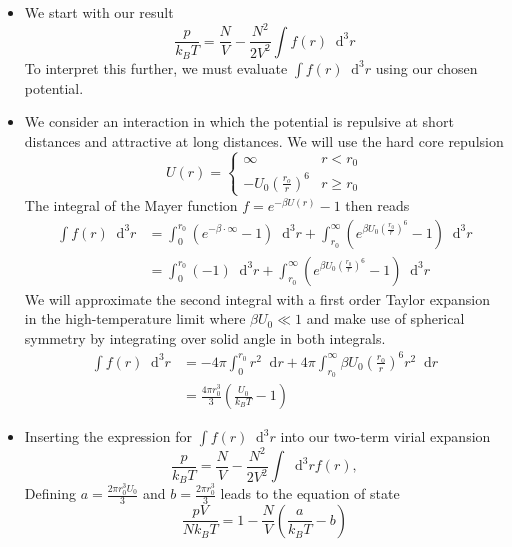 \documentclass[11pt, a4paper]{article}
\newcommand{\diff}{\mathop{}\!\mathrm{d}} %
\begin{document}
\begin{itemize}
	\item We start with our result
	\begin{equation*}
		\frac{p}{k_{B}T} = \frac{N}{V} - \frac{N^{2}}{2V^{2}} \int  f(r) \diff^{3}r
	\end{equation*}
	To interpret this further, we must evaluate $ \int  f(r) \diff^{3}r $ using our chosen potential.
	
	\item We consider an interaction in which the potential is repulsive at short distances and attractive at long distances. We will use the hard core repulsion
	\begin{equation*}
		U(r) = 
		\begin{cases}
			\infty & r < r_{0}\\
			-U_{0}\left(\frac{r_{o}}{r}\right)^{6} & r \geq r_{0}
		\end{cases}
	\end{equation*}
	The integral of the Mayer function $ f = e^{-\beta U(r)} - 1$ then reads
	\begin{align*}
		\int f(r)\diff^{3}r &= \int_{0}^{r_{0}} \left(e^{-\beta \cdot \infty} - 1\right)\diff^{3}r + \int_{r_{0}}^{\infty} \left(e^{\beta U_{0}\left(\frac{r_{0}}{r}\right)^{6}} - 1\right)\diff^{3}r\\
		&=\int_{0}^{r_{0}}(-1)\diff^{3}r + \int_{r_{0}}^{\infty} \left(e^{\beta U_{0}\left(\frac{r_{0}}{r}\right)^{6}} - 1\right)\diff^{3}r
	\end{align*}
	We will approximate the second integral with a first order Taylor expansion in the high-temperature limit where $ \beta U_{0} \ll 1$ and make use of spherical symmetry by integrating over solid angle in both integrals.
	\begin{align*}
		\int f(r)\diff^{3}r &= - 4\pi \int_{0}^{r_{0}}r^{2}\diff r + 4\pi \int_{r_{0}}^{\infty} \beta U_{0}\left(\frac{r_{0}}{r}\right)^{6} r^{2}\diff r\\
		&=\frac{4\pi r_{0}^{3}}{3}\left(\frac{U_{0}}{k_{B}T}-1\right)
	\end{align*}
	\vspace{-5mm}

	\item Inserting the expression for $ \int f(r)\diff^{3}r $ into our two-term virial expansion
	\begin{equation*}
		\frac{p}{k_{B}T} = \frac{N}{V} - \frac{N^{2}}{2V^{2}} \int \diff^{3}r f(r),
	\end{equation*}
	Defining $ a = \frac{2\pi r_{0}^{3}U_{0}}{3} $ and $ b = \frac{2\pi r_{0}^{3}}{3} $ leads to the equation of state
	\begin{equation*}
		\frac{pV}{Nk_{B}T} = 1 -\frac{N}{V}\left(\frac{a}{k_{B}T} - b\right)
	\end{equation*}
	

\end{itemize}
\end{document}
